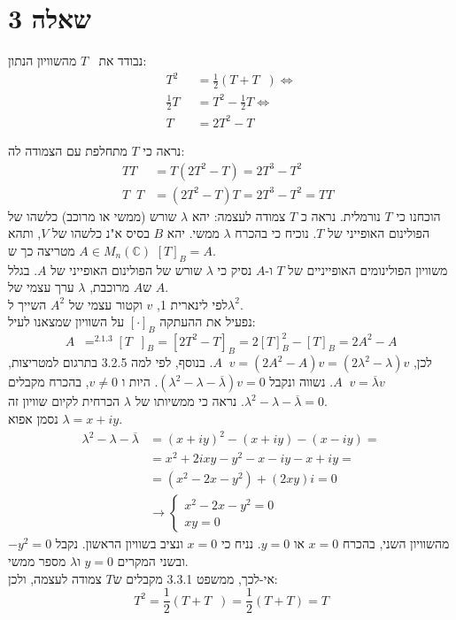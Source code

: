\documentclass{article}
\def\complex{\mathbb{C}}
\DeclareMathOperator*{\equals}{=}
\DeclareMathOperator{\adj}{^\ast}
\begin{document}
\section*{שאלה 3}

נבודד את $T \adj$ מהשוויון הנתון:
\begin{align*}
    T^2                & = \frac{1}{2} (T + T \adj) \Leftrightarrow \\
    \frac{1}{2} T \adj & = T^2 - \frac{1}{2} T \Leftrightarrow      \\
    T \adj             & = 2T^2 - T
\end{align*}

נראה כי $T$ מתחלפת עם הצמודה לה:
\begin{align*}
    TT\adj   & = T(2T^2-T)=2T^3-T^2          \\
    T \adj T & = (2T^2-T)T=2T^3-T^2 = TT\adj
\end{align*}
הוכחנו כי $T$ נורמלית. נראה כ $T$ צמודה לעצמה:
יהא $\lambda$ שורש (ממשי או מרוכב) כלשהו של הפולינום האופייני של $T$. נוכיח כי בהכרח $\lambda$ ממשי.
יהא $B$ בסיס א"נ כלשהו של $V$, ותהא $A\in M_n(\complex)$ מטריצה כך ש $[T]_B=A$. \\
משוויון הפולינומים האופייניים של $T$ ו-$A$ נסיק כי $\lambda$ שורש של הפולינום האופייני של $A$. בגלל ש$A$ מרוכבת, $\lambda$ ערך עצמי של $A$. \\
לפי לינארית 1, $v$ וקטור עצמי של $A^2$ השייך ל$\lambda^2$. \\
נפעיל את ההעתקה $[\cdot]_B$ על השוויון שמצאנו לעיל:
\[
    A \adj \equals^{2.1.3} [T \adj]_B = [2T^2-T]_B = 2[T]_B^2-[T]_B = 2A^2-A
\]
לכן, $A \adj v = (2A^2-A)v=(2\lambda^2-\lambda)v$.
בנוסף, לפי למה 3.2.5 בתרגום למטריצות, $A \adj v = \overline{\lambda}v$. נשווה ונקבל $(\lambda^2-\lambda-\overline{\lambda})v=0$. היות ו $v\ne 0$, בהכרח מקבלים $\lambda^2-\lambda-\overline{\lambda}=0$. נראה כי ממשיותו של $\lambda$ הכרחית לקיום שוויון זה.\\
נסמן אפוא $\lambda=x+iy$.
\begin{align*}
    \lambda^2-\lambda-\overline{\lambda} & =(x+iy)^2-(x+iy)-(x-iy) =            \\
                                         & = x^2 + 2ixy - y^2 -x - iy -x + iy = \\
                                         & = (x^2-2x-y^2)+(2xy)i = 0            \\
                                         & \rightarrow \begin{cases}
                                                           x^2-2x-y^2=0 \\
                                                           xy = 0
                                                       \end{cases}
\end{align*}
מהשוויון השני, בהכרח $x=0$ או $y=0$. נניח כי $x=0$ ונציב בשוויון הראשון. נקבל $-y^2=0$ ובשני המקרים $y=0$ ו$\lambda$ מספר ממשי. \\
אי-לכך, ממשפט 3.3.1 מקבלים ש$T$ צמודה לעצמה, ולכן:
\[
    T^2=\frac{1}{2}(T+T\adj) = \frac{1}{2}(T+T) = T
\]
\end{document}
